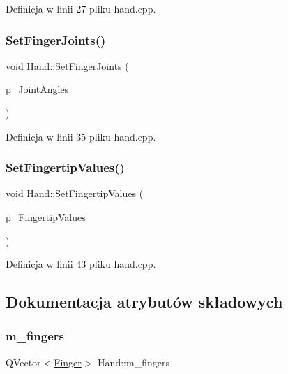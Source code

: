 Definicja w linii 27 pliku hand.\+cpp.

\mbox{\label{class_hand_a52749a0d5baeb2bbd4f133020a5181f1}} 
\subsubsection{\texorpdfstring{Set\+Finger\+Joints()}{SetFingerJoints()}}
{\footnotesize\ttfamily void Hand\+::\+Set\+Finger\+Joints (\begin{DoxyParamCaption}\item[{Q\+Vector$<$ Q\+Vector$<$ float $>$$>$}]{p\+\_\+\+Joint\+Angles }\end{DoxyParamCaption})}



Definicja w linii 35 pliku hand.\+cpp.

\mbox{\label{class_hand_a6fcc256397062529e6fd41d0554bee06}} 
\subsubsection{\texorpdfstring{Set\+Fingertip\+Values()}{SetFingertipValues()}}
{\footnotesize\ttfamily void Hand\+::\+Set\+Fingertip\+Values (\begin{DoxyParamCaption}\item[{Q\+Vector$<$ int $>$}]{p\+\_\+\+Fingertip\+Values }\end{DoxyParamCaption})}



Definicja w linii 43 pliku hand.\+cpp.



\subsection{Dokumentacja atrybutów składowych}
\mbox{\label{class_hand_a303c056fb939dde0845a69720c15e4f8}} 
\subsubsection{\texorpdfstring{m\+\_\+fingers}{m\_fingers}}
{\footnotesize\ttfamily Q\+Vector$<$\hyperlink{class_finger}{Finger}$>$ Hand\+::m\+\_\+fingers\hspace{0.3cm}{\ttfamily [protected]}}



